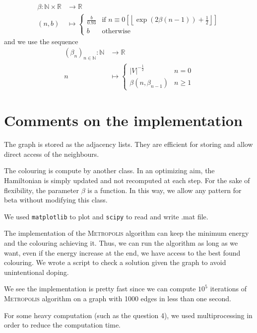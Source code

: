 \documentclass[a4paper, 11pt]{article}
\newcommand{\RR}{\mathbb{R}}
\newcommand{\NN}{\mathbb{N}}
\newcommand{\floor}[1]{{\left\lfloor #1 \right\rfloor}}
\begin{document}
\[
    \begin{aligned}
        \beta : \NN\times\RR &\to \RR\\
        (n, b) &\mapsto
            \begin{cases}
                \frac{b}{0.93} & \text{if } n \equiv 0\left[\floor{\exp(2\beta(n-1))+\frac{1}{2}}\right] \\
                b & \text{otherwise}
            \end{cases}
    \end{aligned}
\]
and we use the sequence
\[
    \begin{aligned}
        \left(\beta_n\right)_{n\in\NN} : \NN &\to \RR\\
        n &\mapsto
            \begin{cases}
                {\lvert V\rvert}^{-\frac{1}{2}} & n = 0 \\
                \beta(n, \beta_{n-1}) & n \geqslant 1
            \end{cases}
    \end{aligned}
\]

\section{Comments on the implementation}

The graph is stored as the adjacency lists. They are efficient for storing and allow direct access of the neighbours.

The colouring is compute by another class. In an optimizing aim, the Hamiltonian is simply updated and not recomputed at each step. For the sake of flexibility, the parameter $\beta$ is a function. In this way, we allow any pattern for beta without modifying this class.

We used \texttt{matplotlib} to plot and \texttt{scipy} to read and write .mat file.

The implementation of the \textsc{Metropolis} algorithm can keep the minimum energy and the colouring achieving it. Thus, we can run the algorithm as long as we want, even if the energy increase at the end, we have access to the best found colouring. We wrote a script to check a solution given the graph to avoid unintentional doping.

We see the implementation is pretty fast since we can compute $10^5$ iterations of \textsc{Metropolis} algorithm on a graph with 1000 edges in less than one second.

For some heavy computation (such as the question 4), we used multiprocessing in order to reduce the computation time.
\end{document}

